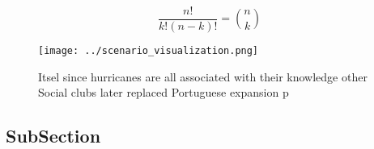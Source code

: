 \documentclass[a4paper]{article}
\begin{document}
\[ \frac{n!}{k!(n-k)!} = \binom{n}{k} \]

\begin{figure}
\centering
\texttt{[image: ../scenario\_visualization.png]}
\caption{Itsel since hurricanes are all associated with their knowledge other Social clubs later replaced Portuguese expansion p
}
\end{figure}
 
\subsection{SubSection}
\end{document}
